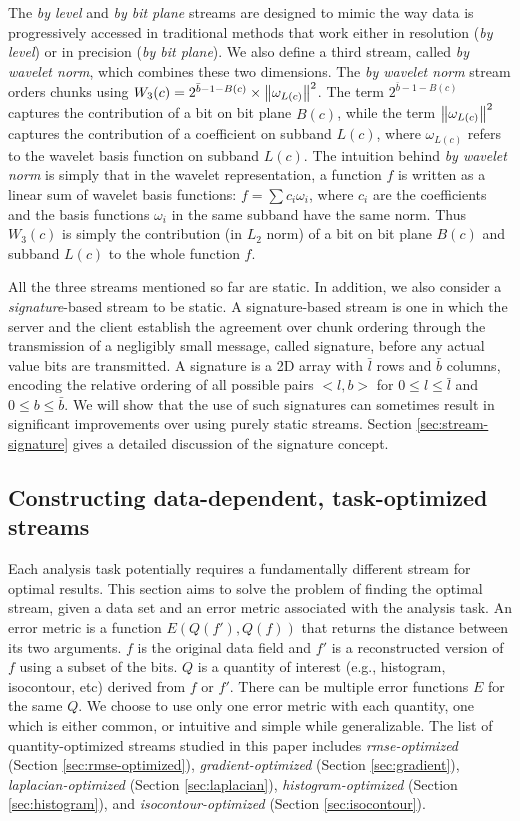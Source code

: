 The \emph{by level} and \emph{by bit plane} streams are designed to mimic the way data is
progressively accessed in traditional methods that work either in resolution (\emph{by level}) or in
precision (\emph{by bit plane}). We also define a third stream, called \emph{by wavelet norm}, which
combines these two dimensions. The \emph{by wavelet norm} stream orders chunks using
$W_3(c)=2^{\bar{b}-1-B(c)}\times \left\lVert\omega_{L(c)}\right\rVert^2$. The term $2^{\bar{b}-1-B(c)}$ captures the
contribution of a bit on bit plane $B(c)$, while the term $\left\lVert\omega_{L(c)}\right\rVert^2$ captures the
contribution of a coefficient on subband $L(c)$, where $\omega_{L(c)}$ refers to the wavelet basis
function on subband $L(c)$. The intuition behind \emph{by wavelet norm} is simply that in the
wavelet representation, a function $f$ is written as a linear sum of wavelet basis functions:
$f=\sum{c_i\omega_i}$, where $c_i$ are the coefficients and the basis functions $\omega_i$ in the
same subband have the same norm. Thus $W_3(c)$ is simply the contribution (in $L_2$ norm) of a bit
on bit plane $B(c)$ and subband $L(c)$ to the whole function $f$.

All the three streams mentioned so far are static. In addition, we also consider a
\emph{signature}-based stream to be static. A signature-based stream is one in which the server and
the client establish the agreement over chunk ordering through the transmission of a negligibly
small message, called signature, before any actual value bits are transmitted. A signature is a 2D
array with $\bar{l}$ rows and $\bar{b}$ columns, encoding the relative ordering of all possible
pairs $<l,b>$ for $0\leq l \leq \bar{l}$ and $0\leq b \leq \bar{b}$. We will show that the use of
such signatures can sometimes result in significant improvements over using purely static streams.
Section \ref{sec:stream-signature} gives a detailed discussion of the signature concept.

\subsection{Constructing data-dependent, task-optimized streams}
\label{sec:data_dep_streams}

Each analysis task potentially requires a fundamentally different stream for optimal results. This
section aims to solve the problem of finding the optimal stream, given a data set and an error
metric associated with the analysis task. An error metric is a function $E(Q(f'),Q(f))$ that returns
the distance between its two arguments. $f$ is the original data field and $f'$ is a reconstructed
version of $f$ using a subset of the bits. $Q$ is a quantity of interest (e.g., histogram,
isocontour, etc) derived from $f$ or $f'$. There can be multiple error functions $E$ for the same
$Q$. We choose to use only one error metric with each quantity, one which is either common, or
intuitive and simple while generalizable. The list of quantity-optimized streams studied in this
paper includes \emph{rmse-optimized} (Section \ref{sec:rmse-optimized}), \emph{gradient-optimized}
(Section \ref{sec:gradient}), \emph{laplacian-optimized} (Section \ref{sec:laplacian}),
\emph{histogram-optimized} (Section \ref{sec:histogram}), and \emph{isocontour-optimized} (Section
\ref{sec:isocontour}).

